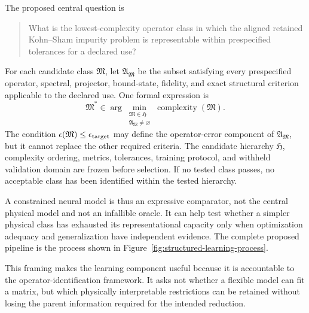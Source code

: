 The proposed central question is
\begin{quote}
What is the lowest-complexity operator class in which the aligned retained
Kohn--Sham impurity problem is representable within prespecified tolerances for
a declared use?
\end{quote}
For each candidate class $\mathfrak M$, let $\mathfrak A_{\mathfrak M}$ be the
subset satisfying every prespecified operator, spectral, projector, bound-state,
fidelity, and exact structural criterion applicable to the declared use. One
formal expression is
\begin{equation}
  \mathfrak M^{\ast}
  \in
  \arg\min_{\substack{\mathfrak M\in\mathfrak H\\
                      \mathfrak A_{\mathfrak M}\ne\varnothing}}
  \operatorname{complexity}(\mathfrak M).
  \label{eq:minimal-operator-class}
\end{equation}
The condition $\epsilon(\mathfrak M)\leq\epsilon_{\rm target}$ may define the
operator-error component of $\mathfrak A_{\mathfrak M}$, but it cannot replace
the other required criteria. The candidate hierarchy $\mathfrak H$, complexity
ordering, metrics, tolerances, training protocol, and withheld validation domain
are frozen before selection. If no tested class passes, no acceptable class has
been identified within the tested hierarchy.

A constrained neural model is thus an expressive comparator, not the central
physical model and not an infallible oracle. It can help test whether a simpler
physical class has exhausted its representational capacity only when
optimization adequacy and generalization have independent evidence. The
complete proposed pipeline is the process shown in
Figure~\ref{fig:structured-learning-process}.

This framing makes the learning component useful because it is accountable to
the operator-identification framework. It asks not whether a flexible model can
fit a matrix, but which physically interpretable restrictions can be retained
without losing the parent information required for the intended reduction.
